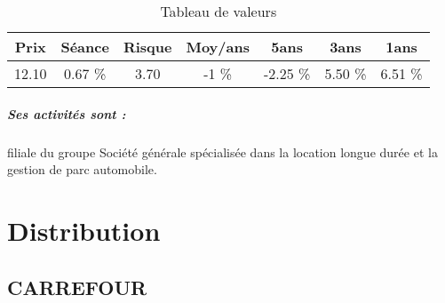 \documentclass[11pt,a4paper]{report}%
\begin{document}
\begin{table}[H]
  \centering
    \begin{tabular}{|c|c|c|c|c|c|c|}
    \hline
    Prix & Séance & Risque  & Moy/ans & 5ans & 3ans & 1ans \\
    \hline
    12.10 &    0.67 \%    & 3.70 & -1 \% & -2.25 \% & 5.50 \% & 6.51 \% \\
    \hline
    \end{tabular}%
        \label{tab:table_ALD}%
      \caption{Tableau de valeurs}
\end{table}%

\paragraph{Ses activités sont : } filiale du groupe Société générale spécialisée dans la location longue durée et la gestion de parc automobile. 
    
    \newpage\chapter{Distribution}


\section{CARREFOUR}
\end{document}
